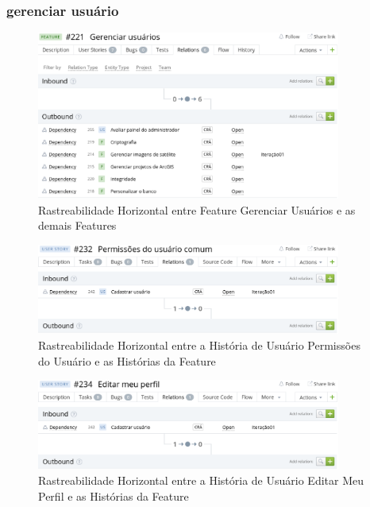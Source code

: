 \subsubsection{gerenciar usuário}

  \begin{figure}[!htb]
    \centering
    \includegraphics[width=10cm, keepaspectratio=false]{figuras/rastreabilidade/horizontal/gerenciar_usuario/feature_gerencia_usuario.eps}
    \caption{Rastreabilidade Horizontal entre Feature Gerenciar Usuários e as demais Features}
  \end{figure}

  \begin{figure}[!htb]
    \centering
    \includegraphics[width=10cm, keepaspectratio=false]{figuras/rastreabilidade/horizontal/gerenciar_usuario/historia_permissoes.eps}
    \caption{Rastreabilidade Horizontal entre a História de Usuário Permissões do Usuário e as Histórias da Feature}
  \end{figure}


  \begin{figure}[!htb]
    \centering
    \includegraphics[width=10cm, keepaspectratio=false]{figuras/rastreabilidade/horizontal/gerenciar_usuario/historia_editar_perfil.eps}
    \caption{Rastreabilidade Horizontal entre a História de Usuário Editar Meu Perfil e as Histórias da Feature}
  \end{figure}


